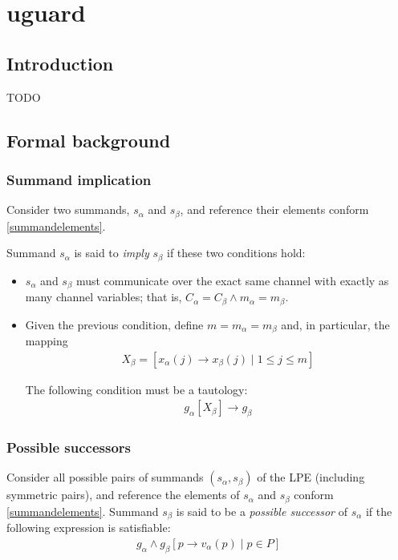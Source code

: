 \chapter{uguard}

\section{Introduction}

TODO

\section{Formal background}

\subsection{Summand implication}

Consider two summands, $s_\alpha$ and $s_\beta$, and reference their elements conform \ref{summandelements}.

Summand $s_\alpha$ is said to \emph{imply} $s_\beta$ if these two conditions hold:

\begin{itemize}
\item $s_\alpha$ and $s_\beta$ must communicate over the exact same channel with exactly as many channel variables; that is, $C_\alpha = C_\beta \land m_\alpha = m_\beta$.

\item Given the previous condition, define $m = m_\alpha = m_\beta$ and, in particular, the mapping
\begin{align*}
X_\beta = [x_\alpha(j) \rightarrow x_\beta(j) \;|\; 1 \leq j \leq m]
\end{align*}

The following condition must be a tautology:
\begin{align*}
g_\alpha[X_\beta] \rightarrow g_\beta
\end{align*}
\end{itemize}

\subsection{Possible successors}

Consider all possible pairs of summands $(s_\alpha, s_\beta)$ of the LPE (including symmetric pairs), and reference the elements of $s_\alpha$ and $s_\beta$ conform \ref{summandelements}.
Summand $s_\beta$ is said to be a \emph{possible successor} of $s_\alpha$ if the following expression is satisfiable:
\begin{align*}
g_\alpha \land {g_\beta}[p \rightarrow v_\alpha(p) \;|\; p \in P]
\end{align*}

